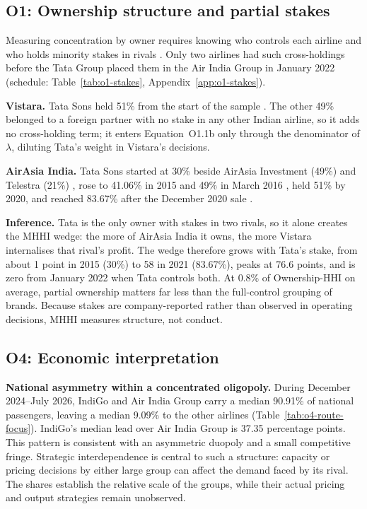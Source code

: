 \documentclass[12pt,a4paper]{article}
\newif\ifoneon
\newcommand{\oneHL}{\par\oneontrue\color{orange}\captionsetup{font+={color=blue}}}
\begin{document}
\clearpage
{\oneHL \subsection{O1: Ownership structure and partial stakes}
Measuring concentration by owner requires knowing who controls each airline and who holds minority stakes in rivals \parencite{obriensalop2000}. Only two airlines had such cross-holdings before the Tata Group placed them in the Air India Group in January 2022 (schedule: Table~\ref{tab:o1-stakes}, Appendix~\ref{app:o1-stakes}).

\textbf{Vistara.} Tata Sons held 51\% from the start of the sample \parencite{sia2015annual,sia2022merger}. The other 49\% belonged to a foreign partner with no stake in any other Indian airline, so it adds no cross-holding term; it enters Equation~O1.1b only through the denominator of $\lambda$, diluting Tata's weight in Vistara's decisions.

\textbf{AirAsia India.} Tata Sons started at 30\% beside AirAsia Investment (49\%) and Telestra (21\%) \parencite{airasia2013jv}, rose to 41.06\% in 2015 and 49\% in March 2016 \parencite{tata2016airasia,airasia2018q4}, held 51\% by 2020, and reached 83.67\% after the December 2020 sale \parencite{airasia2021disposal,airasia2021results}.

\textbf{Inference.} Tata is the only owner with stakes in two rivals, so it alone creates the MHHI wedge: the more of AirAsia India it owns, the more Vistara internalises that rival's profit. The wedge therefore grows with Tata's stake, from about 1 point in 2015 (30\%) to 58 in 2021 (83.67\%), peaks at 76.6 points, and is zero from January 2022 when Tata controls both. At 0.8\% of Ownership-HHI on average, partial ownership matters far less than the full-control grouping of brands. Because stakes are company-reported rather than observed in operating decisions, MHHI measures structure, not conduct.
\par}

\subsection{O4: Economic interpretation}
\textbf{National asymmetry within a concentrated oligopoly.} During December 2024--July 2026, IndiGo and Air India Group carry a median 90.91\% of national passengers, leaving a median 9.09\% to the other airlines (Table~\ref{tab:o4-route-focus}). IndiGo's median lead over Air India Group is 37.35 percentage points. This pattern is consistent with an asymmetric duopoly and a small competitive fringe. Strategic interdependence is central to such a structure: capacity or pricing decisions by either large group can affect the demand faced by its rival. The shares establish the relative scale of the groups, while their actual pricing and output strategies remain unobserved.
\end{document}
